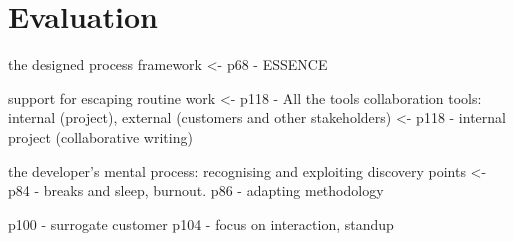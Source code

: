 \section{Evaluation}



the designed process framework <- p68 - ESSENCE

support for escaping routine work <- p118 - All the tools
collaboration tools: internal (project), external (customers and other stakeholders) <- p118 - internal project (collaborative writing)





the developer’s mental process: recognising and exploiting discovery points <- p84 - breaks and sleep, burnout. p86 - adapting methodology



p100 - surrogate customer
p104 - focus  on  interaction, standup
